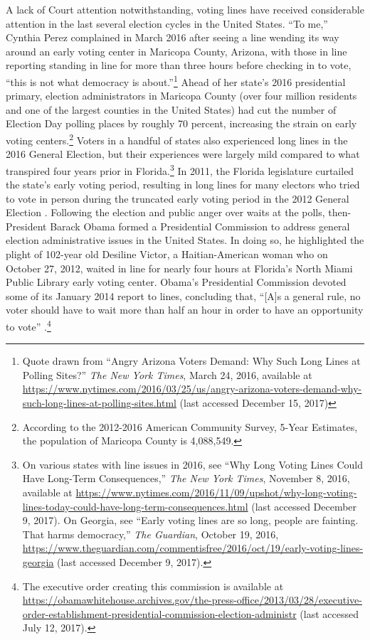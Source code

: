 \documentclass[12pt,titlepage]{article}
\begin{document}
A lack of Court attention notwithstanding, voting lines have received
considerable attention in the last several election cycles in the
United States.  ``To me,'' Cynthia Perez complained in March 2016
after seeing a line wending its way around an early voting center in
Maricopa County, Arizona, with those in line reporting standing in
line for more than three hours before checking in to vote, ``this is
not what democracy is about.''\footnote{Quote drawn from ``Angry
  Arizona Voters Demand: Why Such Long Lines at Polling Sites?''
  \emph{The New York Times}, March 24, 2016, available at
  \url{https://www.nytimes.com/2016/03/25/us/angry-arizona-voters-demand-why-such-long-lines-at-polling-sites.html}
  (last accessed December 15, 2017)} Ahead of her state's 2016
presidential primary, election administrators in Maricopa County (over
four million residents and one of the largest counties in the United
States) had cut the number of Election Day polling places by roughly
70 percent, increasing the strain on early voting
centers.\footnote{According to the 2012-2016 American Community
  Survey, 5-Year Estimates, the population of Maricopa County is
  4,088,549.}  Voters in a handful of states also experienced long
lines in the 2016 General Election, but their experiences were largely
mild compared to what transpired four years prior in
Florida.\footnote{On various states with line issues in 2016, see
  ``Why Long Voting Lines Could Have Long-Term Consequences,''
  \emph{The New York Times}, November 8, 2016, available at
  \url{https://www.nytimes.com/2016/11/09/upshot/why-long-voting-lines-today-could-have-long-term-consequences.html}
  (last accessed December 9, 2017).  On Georgia, see ``Early voting
  lines are so long, people are fainting. That harms democracy,''
  \emph{The Guardian}, October 19, 2016,
  \url{https://www.theguardian.com/commentisfree/2016/oct/19/early-voting-lines-georgia}
  (last accessed December 9, 2017).} In 2011, the Florida legislature
curtailed the state's early voting period, resulting in long lines for
many electors who tried to vote in person during the truncated early
voting period in the 2012 General Election
\citep{herron_smith2014}. Following the election and public anger over
waits at the polls, then-President Barack Obama formed a Presidential
Commission to address general election administrative issues in the
United States. In doing so, he highlighted the plight of 102-year old
Desiline Victor, a Haitian-American woman who on October 27, 2012,
waited in line for nearly four hours at Florida's North Miami Public
Library early voting center. Obama's Presidential Commission devoted
some of its January 2014 report to lines, concluding that, ``[A]s a
general rule, no voter should have to wait more than half an hour in
order to have an opportunity to vote'' \citep[p.\
13,][]{pcea:2014}.\footnote{The executive order creating this
  commission is available at
  \url{https://obamawhitehouse.archives.gov/the-press-office/2013/03/28/executive-order-establishment-presidential-commission-election-administr}
  (last accessed July 12, 2017).}
\end{document}
